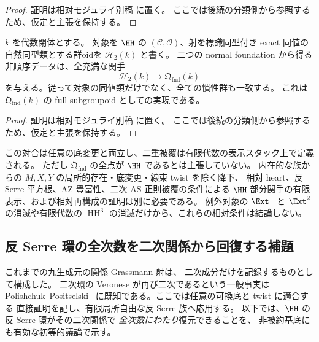 \begin{proof}
証明は相対モジュライ別稿 \cite[\texttt{foundation_stack} 節]{QuadricModuli2026} に置く。
ここでは後続の分類側から参照するため、仮定と主張を保持する。
\end{proof}

\begin{corollary}[$\HH$ の幾何点群oidの全充満な実現]
\label{cor:h2-point-groupoid-foundation}
$k$ を代数閉体とする。
対象を $\HH$ の $(\mathcal C,\mathcal O)$、射を標識同型付き exact 同値の
自然同型類とする群oidを $\mathcal H_2(k)$ と書く。
二つの normal foundation から得る非順序データは、全充満な関手
\[
 \mathcal H_2(k)\longrightarrow\mathfrak Q_{\mathrm{fnd}}(k)
\]
を与える。従って対象の同値類だけでなく、全ての慣性群も一致する。
これは $\mathfrak Q_{\mathrm{fnd}}(k)$ の full subgroupoid としての実現である。
\end{corollary}

\begin{proof}
証明は相対モジュライ別稿 \cite[\texttt{foundation_stack} 節]{QuadricModuli2026} に置く。
ここでは後続の分類側から参照するため、仮定と主張を保持する。
\end{proof}

\begin{remark}[この相対構成の射程]
この対合は任意の底変更と両立し、二重被覆は有限代数の表示スタック上で定義される。
ただし $\mathfrak Q_{\mathrm{fnd}}$ の全点が $\HH$ であるとは主張していない。
内在的な族からの $M,X,Y$ の局所的存在・底変更・線束 twist を除く降下、
相対 heart、反 Serre 平方根、AZ 豊富性、二次 AS 正則被覆の条件による
$\HH$ 部分関手の有限表示、および相対再構成の証明は別に必要である。
例外対象の $\Ext^1$ と $\Ext^2$ の消滅や有限代数の
$\operatorname{HH}^3$ の消滅だけから、これらの相対条件は結論しない。
\end{remark}

\subsection{反 Serre 環の全次数を二次関係から回復する補題}
\label{subsec:relative-quadratic-veronese}

これまでの九生成元の関係 Grassmann 射は、
二次成分だけを記録するものとして構成した。
二次環の Veronese が再び二次であるという一般事実は
Polishchuk--Positselski~\cite[Chapter 3, Proposition 2.2]{PolishchukPositselski2005}
に既知である。ここでは任意の可換底と twist に適合する
直接証明を記し、有限局所自由な反 Serre 族へ応用する。
以下では、$\HH$ の反 Serre 環がその二次関係で
\emph{全次数にわたり}復元できることを、
非被約基底にも有効な初等的議論で示す。


